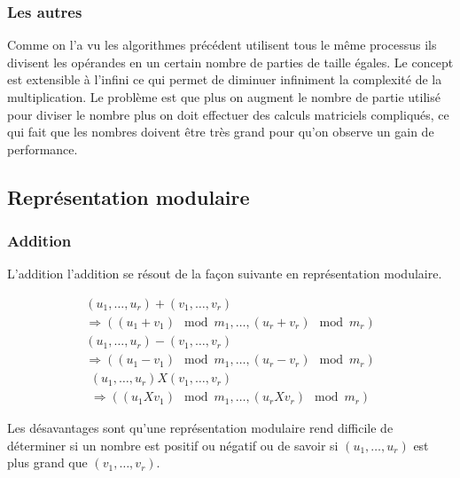 \documentclass[letterpaper]{article}
\begin{document}
\subsubsection{Les autres}

Comme on l'a vu les algorithmes précédent utilisent tous le même processus ils
divisent les opérandes en un certain nombre de parties de taille égales. Le
concept est extensible à l'infini ce qui permet de diminuer infiniment la
complexité de la multiplication. Le problème est que plus on augment le nombre
de partie utilisé pour diviser le nombre plus on doit effectuer des calculs
matriciels compliqués, ce qui fait que les nombres doivent être très grand pour
qu'on observe un gain de performance.

\subsection{Représentation modulaire}

\subsubsection{Addition}

L'addition l'addition se résout de la façon suivante en représentation
modulaire.

\begin{equation}
  \begin{split}
    (u_1, \dots, u_r) + (v_1, \dots, v_r) \\
     \Rightarrow ((u_1 + v_1) \mod m_1, \dots, (u_r + v_r) \mod m_r)
  \end{split}
\end{equation}
\begin{equation}
  \begin{split}
    (u_1, \dots, u_r) - (v_1, \dots, v_r) \\
      \Rightarrow ((u_1 - v_1) \mod m_1, \dots, (u_r - v_r) \mod m_r)
  \end{split}
\end{equation}
\begin{equation}
  \begin{split}
    (u_1, \dots, u_r) X (v_1, \dots, v_r) \\
      \Rightarrow ((u_1 X v_1) \mod m_1, \dots, (u_r X v_r) \mod m_r)
  \end{split}
\end{equation}

Les désavantages sont qu'une représentation modulaire rend difficile de
déterminer si un nombre est positif ou négatif ou de savoir si
$(u_1, \dots, u_r)$ est plus grand que $(v_1, \dots, v_r)$.
\end{document}
